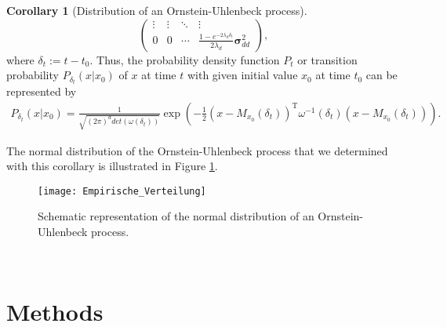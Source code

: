 \documentclass[11pt,titlepage]{article}
\theoremstyle{definition}
\newtheorem{corollary}[theorem]{Corollary}
\theoremstyle{remark}
\begin{document}
\begin{corollary}[Distribution of an Ornstein-Uhlenbeck process]
\[\begin{pmatrix}
			\vdots & \vdots & \ddots & \vdots \\
			0 & 0 & \cdots & \frac{1- e^{-2\lambda_d \delta_t}}{2\lambda_d} \boldsymbol{\sigma}_{dd}^2 
		\end{pmatrix},\]
		where $\delta_t := t-t_0$. 
		Thus, the probability density function $P_t$ or transition probability $P_{\delta_t}(x\vert x_0)$ of $x$ at time $t$ with 
		given initial value $x_0$ at time $t_0$ can be represented by
		\begin{align*}
			P_{\delta_t}(x\vert x_0) = \frac{1}{\sqrt{(2\pi)^d det(\omega(\delta_t))}}\exp\left(-\frac{1}{2}(x- M_{x_0}(\delta_t))^{\text{T}}\omega^{-1}(\delta_t)(x-M_{x_0}(\delta_t))\right).
		\end{align*}
	\end{corollary}

	The normal distribution of the Ornstein-Uhlenbeck process that we determined with this corollary is illustrated in Figure \ref{Abb Empirische Verteilung1}.
	\clearpage
	\begin{figure}[htbp]
		\centering
		\texttt{[image: Empirische\_Verteilung]}
		\caption{Schematic representation of the normal distribution of an Ornstein-Uhlenbeck process.}
		\label{Abb Empirische Verteilung1}
	\end{figure}
	
	\newpage
	\ 
	\newpage
	
	\section{Methods} \label{sec methods}
	
\end{document}
